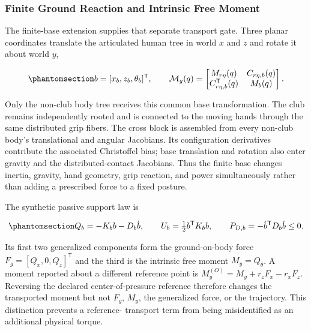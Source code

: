 \documentclass[
  letterpaper,
]{report}
\begin{document}
\subsubsection{Finite Ground Reaction and Intrinsic Free
Moment}\label{finite-ground-reaction-and-intrinsic-free-moment}

The finite-base extension supplies that separate transport gate. Three
planar coordinates translate the articulated human tree in world \(x\)
and \(z\) and rotate it about world \(y\),

\begin{equation}\phantomsection\label{eq-articulated-ground-mass}{
b=[x_b,z_b,\theta_b]^\mathsf{T}, \qquad
\mathcal{M}_g(q)=
\begin{bmatrix}
M_{r\eta}(q) & C_{r\eta,b}(q)\\
C_{r\eta,b}^\mathsf{T}(q) & M_b(q)
\end{bmatrix}.
}\end{equation}

Only the non-club body tree receives this common base transformation.
The club remains independently rooted and is connected to the moving
hands through the same distributed grip fibers. The cross block is
assembled from every non-club body's translational and angular
Jacobians. Its configuration derivatives contribute the associated
Christoffel bias; base translation and rotation also enter gravity and
the distributed-contact Jacobians. Thus the finite base changes inertia,
gravity, hand geometry, grip reaction, and power simultaneously rather
than adding a prescribed force to a fixed posture.

The synthetic passive support law is

\begin{equation}\phantomsection\label{eq-articulated-ground-passivity}{
Q_b=-K_b b-D_b\dot b, \qquad
U_b=\tfrac12 b^\mathsf{T}K_b b, \qquad
P_{D,b}=-\dot b^\mathsf{T}D_b\dot b\le 0.
}\end{equation}

Its first two generalized components form the ground-on-body force
\(F_g=[Q_x,0,Q_z]^\mathsf{T}\) and the third is the intrinsic free
moment \(M_y=Q_\theta\). A moment reported about a different reference
point is \(M_y^{(O)}=M_y+r_zF_x-r_xF_z\). Reversing the declared
center-of-pressure reference therefore changes the transported moment
but not \(F_g\), \(M_y\), the generalized force, or the trajectory. This
distinction prevents a reference- transport term from being
misidentified as an additional physical torque.
\end{document}
